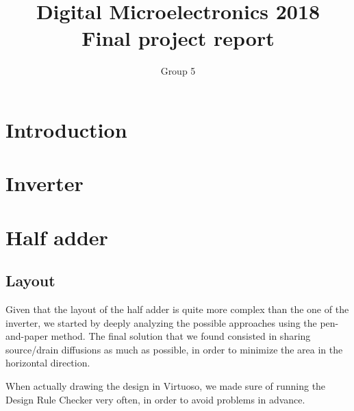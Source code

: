 \documentclass[a4paper]{article}
\title{Digital Microelectronics 2018 \\ Final project report}
\author{Group 5}
\begin{document}
\maketitle

\section{Introduction}

\section{Inverter}

\section{Half adder}

\subsection{Layout}
Given that the layout of the half adder is quite more complex than the one of the inverter, we started by deeply analyzing the possible approaches using the pen-and-paper method. The final solution that we found consisted in sharing source/drain diffusions as much as possible, in order to minimize the area in the horizontal direction.

When actually drawing the design in Virtuoso, we made sure of running the Design Rule Checker very often, in order to avoid problems in advance. 
\end{document}
